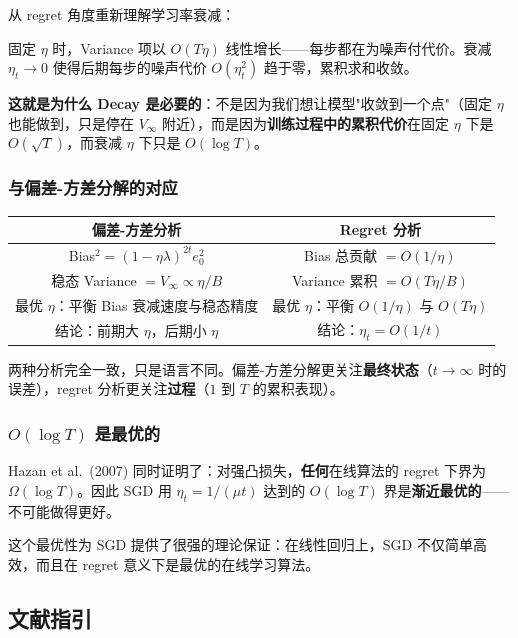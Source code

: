 \documentclass[12pt, a4paper]{ctexart}
\begin{document}
从 regret 角度重新理解学习率衰减：

固定 $\eta$ 时，Variance 项以 $O(T\eta)$ 线性增长——每步都在为噪声付代价。衰减 $\eta_t \to 0$ 使得后期每步的噪声代价 $O(\eta_t^2)$ 趋于零，累积求和收敛。

\textbf{这就是为什么 Decay 是必要的}：不是因为我们想让模型"收敛到一个点"（固定 $\eta$ 也能做到，只是停在 $V_\infty$ 附近），而是因为\textbf{训练过程中的累积代价}在固定 $\eta$ 下是 $O(\sqrt{T})$，而衰减 $\eta$ 下只是 $O(\log T)$。

\subsubsection{与偏差-方差分解的对应}

\begin{center}
\begin{tabular}{c|c}
\textbf{偏差-方差分析} & \textbf{Regret 分析} \\
\hline
Bias$^2 = (1-\eta\lambda)^{2t} e_0^2$ & Bias 总贡献 $= O(1/\eta)$ \\
稳态 Variance $= V_\infty \propto \eta/B$ & Variance 累积 $= O(T\eta/B)$ \\
最优 $\eta$：平衡 Bias 衰减速度与稳态精度 & 最优 $\eta$：平衡 $O(1/\eta)$ 与 $O(T\eta)$ \\
结论：前期大 $\eta$，后期小 $\eta$ & 结论：$\eta_t = O(1/t)$ \\
\end{tabular}
\end{center}

两种分析完全一致，只是语言不同。偏差-方差分解更关注\textbf{最终状态}（$t \to \infty$ 时的误差），regret 分析更关注\textbf{过程}（$1$ 到 $T$ 的累积表现）。

\subsubsection{$O(\log T)$ 是最优的}

Hazan et al.\ (2007) 同时证明了：对强凸损失，\textbf{任何}在线算法的 regret 下界为 $\Omega(\log T)$。因此 SGD 用 $\eta_t = 1/(\mu t)$ 达到的 $O(\log T)$ 界是\textbf{渐近最优的}——不可能做得更好。

这个最优性为 SGD 提供了很强的理论保证：在线性回归上，SGD 不仅简单高效，而且在 regret 意义下是最优的在线学习算法。

\subsection{文献指引}
\end{document}
